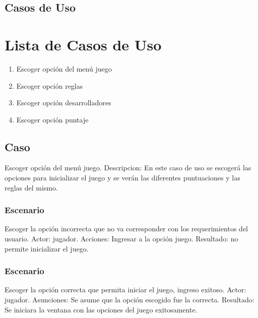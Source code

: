 \section{Casos de Uso}

\maketitle
\chapter{Lista de Casos de Uso}

\begin{enumerate}
	\item {Escoger opción del menú juego}
	\item {Escoger opción reglas}	
	\item{Escoger opción desarrolladores}
	\item{Escoger opción puntaje}
\end{enumerate}

\section{Caso}Escoger  opción del menú juego.\newline\newline
Descripcion: En este caso de uso se escogerá las opciones para inicializar el juego y se verán  las diferentes  puntuaciones y las reglas del mismo.

	\subsection{Escenario}
	 Escoger la opción incorrecta que no va corresponder con los requerimientos del usuario.\newline \newline
Actor: jugador.\newline
Acciones: Ingresar a la opción juego.\newline
Resultado: no permite inicializar el juego.\newline

\subsection{Escenario}
Escoger la opción correcta que permita iniciar el  juego, ingreso exitoso.\newline\newline
Actor: jugador.\newline
Asunciones:  Se asume  que la opción escogido fue la correcta.\newline
Resultado: Se iniciara la ventana con las opciones del juego exitosamente.
 
